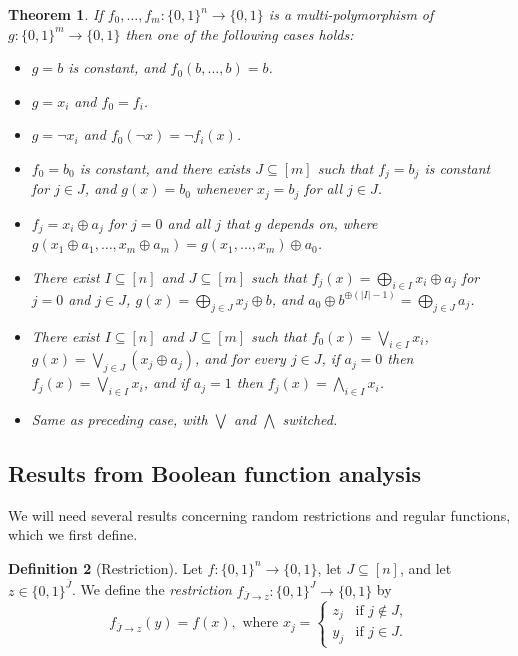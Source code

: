 \documentclass{article}
\newtheorem{theorem}{Theorem}[section]
\theoremstyle{definition}
\newtheorem{definition}[theorem]{Definition}
\theoremstyle{remark}
\providecommand{\biglor}{\bigvee}
\providecommand{\bigland}{\bigwedge}
\begin{document}
\begin{theorem}
\label{thm:exact-multi-polymorphisms}
If $f_0,\ldots,f_m\colon \{0,1\}^n \to \{0,1\}$ is a multi-polymorphism of $g\colon \{0,1\}^m \to \{0,1\}$ then one of the following cases holds:
\begin{itemize}
    \item $g = b$ is constant, and $f_0(b,\ldots,b) = b$.
    \item $g = x_i$ and $f_0 = f_i$.
    \item $g = \lnot x_i$ and $f_0(\lnot x) = \lnot f_i(x)$.
    \item $f_0 = b_0$ is constant, and there exists $J \subseteq [m]$ such that $f_j = b_j$ is constant for $j \in J$, and $g(x) = b_0$ whenever $x_j = b_j$ for all $j \in J$.
    \item $f_j = x_i \oplus a_j$ for $j = 0$ and all $j$ that $g$ depends on, where $g(x_1 \oplus a_1,\ldots,x_m \oplus a_m) = g(x_1,\ldots,x_m) \oplus a_0$.
    \item There exist $I \subseteq [n]$ and $J \subseteq [m]$ such that $f_j(x) = \bigoplus_{i \in I} x_i \oplus a_j$ for $j = 0$ and $j \in J$, $g(x) = \bigoplus_{j \in J} x_j \oplus b$, and $a_0 \oplus b^{\oplus (|I|-1)} = \bigoplus_{j \in J} a_j$.
    \item There exist $I \subseteq [n]$ and $J \subseteq [m]$ such that $f_0(x) = \biglor_{i \in I} x_i$, $g(x) = \biglor_{j \in J} (x_j \oplus a_j)$, and for every $j \in J$, if $a_j = 0$ then $f_j(x) = \biglor_{i \in I} x_i$, and if $a_j = 1$ then $f_j(x) = \bigland_{i \in I} x_i$.
    \item Same as preceding case, with $\biglor$ and $\bigland$ switched.
\end{itemize}
\end{theorem}

\subsection{Results from Boolean function analysis}
\label{sec:prel-bfa}

We will need several results concerning random restrictions and regular functions, which we first define.

\begin{definition}[Restriction]
Let $f\colon \{0,1\}^n \to \{0,1\}$, let $J \subseteq [n]$, and let $z \in \{0,1\}^{\overline{J}}$. We define the \emph{restriction} $f_{\overline{J}\to z}\colon \{0,1\}^J \to \{0,1\}$ by
\[
 f_{\overline{J} \to z}(y) = f(x),
 \text{ where }
 x_j = \begin{cases}
 z_j & \text{if } j \notin J, \\
 y_j & \text{if } j \in J.
 \end{cases}
\]
\end{definition}
\end{document}
